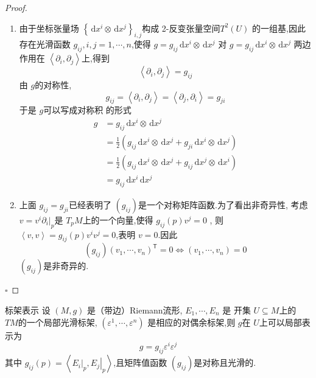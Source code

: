 \documentclass[../../几何与拓扑.tex]{subfiles}
\begin{document}
\begin{proof}
    \begin{enumerate}
        \item 由于坐标张量场 \(  \left\{ \,\mathrm{d} x^{i}\otimes \,\mathrm{d} x^{j} \right\} _{i,j} \)构成  2-反变张量空间\(  T^{2}\left( U \right)   \) 的一组基,因此存在光滑函数 \(  g_{ij},i,j=  1,\cdots,n   \),使得 \(  g =  g_{ij} \,\mathrm{d} x^{i}\otimes \,\mathrm{d} x^{j}  \)  
     对 \(  g =  g_{ij} \,\mathrm{d} x^{i}\otimes  \,\mathrm{d} x^{j}  \) 两边作用在 \(  \left< \partial _{i},\partial _{j} \right>  \)上,得到 \[
    \left<\partial _{i} ,\partial _{j} \right> =  g_{ij}
     \]由 \(  g  \)的对称性, \[
     g_{ij} =  \left<\partial _{i},\partial _{j} \right> = \left<\partial _{j},\partial _{i} \right>=  g_{ji}
     \]  于是 \(  g  \)可以写成对称积 的形式 \[
     \begin{aligned}
     g& =  g_{ij}\,\mathrm{d} x^{i}\otimes \,\mathrm{d} x^{j}\\ 
      & =  \frac{1}{2}\left( g_{ij}\,\mathrm{d} x^{i}\otimes \,\mathrm{d} x^{j}+  g_{ji}\,\mathrm{d} x^{i}\otimes \,\mathrm{d} x^{j} \right)  \\ 
       & =  \frac{1}{2}\left( g_{ij} \,\mathrm{d} x^{i}\otimes \,\mathrm{d} x^{j}+ g_{ij} \,\mathrm{d} x^{j}\otimes \,\mathrm{d} x^{i} \right) \\ 
        &=  g_{ij} \,\mathrm{d} x^{i}\,\mathrm{d} x^{j}
     \end{aligned}
     \] 
     \item 上面 \(  g_{ij}=  g_{ji}  \)已经表明了 \(  \left( g_{ij} \right)   \)是一个对称矩阵函数.为了看出非奇异性,
     考虑 \(  v =  v^{i} \partial _{i}|_{p}  \)是 \(  T_{p}M  \)上的一个向量,使得 \(  g_{ij}\left( p \right)v^{j}= 0   \)   ,
     则 \(  \left<v,v \right> = g_{ij}\left( p \right)v^{i}v^{j} =  0   \),表明 \(  v = 0  \).因此 \[
     \left( g_{ij} \right) \left(  v_1,\cdots,v_n  \right)^{\mathsf{T}}= 0 \iff   \left(  v_1,\cdots,v_n  \right)= 0   
     \]   \(  \left( g_{ij} \right)   \)是非奇异的.  
    \end{enumerate}
    

    \hfill $\square$
\end{proof}


\begin{proposition}{标架表示}
    设 \(  \left( M,g \right)   \) 是（带边）Riemann流形, \(   E_1,\cdots,E_n   \) 是 开集 \(  U\subseteq M  \)上的 \(  TM  \)的一个局部光滑标架,
     \(  \left(  \varepsilon^1,\cdots,\varepsilon^n    \right)   \)  是相应的对偶余标架,则 \(  g  \)在 \(  U  \)上可以局部表示为 \[
     g =  g_{ij} \varepsilon ^{i} \varepsilon ^{j}
     \] 其中 \(  g_{ij}\left( p \right)= \left<\left. E_{i} \right|_{p},\left. E_{j} \right|_{p} \right>   \),且矩阵值函数 \(  \left( g_{ij} \right)   \)是对称且光滑的.  
\end{proposition}
\end{document}
